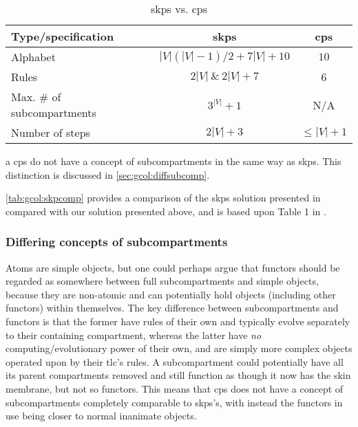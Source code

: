 \begin{table}
\begin{threeparttable}
\centering
\caption{\acrlong{skps} vs. \gls{cps}}
\label{tab:gcol:skpcomp}
\begin{tabular}{@{}lcc@{}}
\toprule
Type/specification                & \gls{skps}        & \gls{cps} \\ \midrule
Alphabet                          & \(|V|(|V|-1)/2 + 7|V| + 10\) & \(10\)         \\
Rules                             & \(2|V|~\&~2|V| + 7\)       & 6          \\
Max. \# of subcompartments & \(3^|V| + 1\)             & N/A\tnote{a}          \\
Number of steps                   & \(2|V| + 3\)             & \(\leq |V| + 1\)         \\ \bottomrule
\end{tabular}%
\begin{tablenotes}
\item[a] \gls{cps} do not have a concept of subcompartments in the same way as \gls{skps}.  This distinction is discussed in \autoref{sec:gcol:diffsubcomp}.
\end{tablenotes}
\end{threeparttable}
\end{table}


\autoref{tab:gcol:skpcomp} provides a comparison of the \gls{skps} solution presented in \cite{Gheorghe2013} compared with our solution presented above, and is based upon Table 1 in \cite{Gheorghe2013}.  

\subsubsection{\label{sec:gcol:diffsubcomp}Differing concepts of subcompartments}
Atoms are simple objects, but one could perhaps argue that functors should be regarded as somewhere between full subcompartments and simple objects, because they are non-atomic and can potentially hold objects (including other functors) within themselves.  The key difference between subcompartments and functors is that the former have rules of their own and typically evolve separately to their containing compartment, whereas the latter have \emph{no} computing/evolutionary power of their own, and are simply more complex objects operated upon by their \gls{tlc}'s rules.  A subcompartment could potentially have all its parent compartments removed and still function as though it now has the skin membrane, but not so functors.  This means that \gls{cps} does not have a concept of subcompartments completely comparable to \gls{skps}'s, with instead the functors in use being closer to normal inanimate objects.


